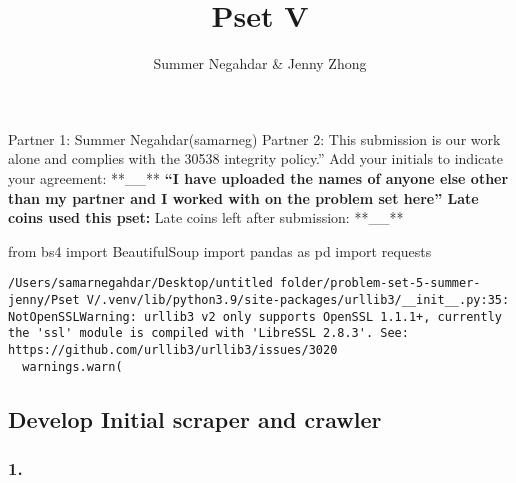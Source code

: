 \documentclass[
  letterpaper,
  DIV=11,
  numbers=noendperiod]{scrartcl}
\title{Pset V}
\author{Summer Negahdar \& Jenny Zhong}
\date{}
\newenvironment{Shaded}{\begin{snugshade}}{\end{snugshade}}
\newcommand{\ImportTok}[1]{\textcolor[rgb]{0.00,0.46,0.62}{#1}}
\newcommand{\NormalTok}[1]{\textcolor[rgb]{0.00,0.23,0.31}{#1}}
\begin{document}
\maketitle



Partner 1: Summer Negahdar(samarneg) Partner 2: This submission is our
work alone and complies with the 30538 integrity policy.'' Add your
initials to indicate your agreement: **\_\_** \textbf{\textbf{\textbf{
``I have uploaded the names of anyone else other than my partner and I
worked with on the problem set here'' Late coins used this pset: }}}
Late coins left after submission: **\_\_**

\begin{Shaded}
\begin{Highlighting}[]
\ImportTok{from}\NormalTok{ bs4 }\ImportTok{import}\NormalTok{ BeautifulSoup}
\ImportTok{import}\NormalTok{ pandas }\ImportTok{as}\NormalTok{ pd}
\ImportTok{import}\NormalTok{ requests}
\end{Highlighting}
\end{Shaded}

\begin{verbatim}
/Users/samarnegahdar/Desktop/untitled folder/problem-set-5-summer-jenny/Pset V/.venv/lib/python3.9/site-packages/urllib3/__init__.py:35: NotOpenSSLWarning: urllib3 v2 only supports OpenSSL 1.1.1+, currently the 'ssl' module is compiled with 'LibreSSL 2.8.3'. See: https://github.com/urllib3/urllib3/issues/3020
  warnings.warn(
\end{verbatim}

\subsection{Develop Initial scraper and
crawler}\label{develop-initial-scraper-and-crawler}

\subsubsection{1.}\label{section}
\end{document}
